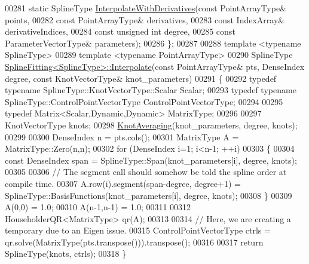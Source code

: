 \begin{DoxyCode}
00281     \textcolor{keyword}{static} SplineType \hyperlink{group___splines___module_a7bd937fdcfa168dbdc27932886a4da9f}{InterpolateWithDerivatives}(\textcolor{keyword}{const} PointArrayType& points,
00282                                                  \textcolor{keyword}{const} PointArrayType& derivatives,
00283                                                  \textcolor{keyword}{const} IndexArray& derivativeIndices,
00284                                                  \textcolor{keyword}{const} \textcolor{keywordtype}{unsigned} \textcolor{keywordtype}{int} degree,
00285                                                  \textcolor{keyword}{const} ParameterVectorType& parameters);
00286   \};
00287 
00288   \textcolor{keyword}{template} <\textcolor{keyword}{typename} SplineType>
00289   \textcolor{keyword}{template} <\textcolor{keyword}{typename} Po\textcolor{keywordtype}{int}ArrayType>
00290   SplineType \hyperlink{group___splines___module_adc80b6f0dd0dbbea28130fb254626874}{SplineFitting<SplineType>::Interpolate}(\textcolor{keyword}{const} 
      PointArrayType& pts, DenseIndex degree, \textcolor{keyword}{const} KnotVectorType& knot\_parameters)
00291   \{
00292     \textcolor{keyword}{typedef} \textcolor{keyword}{typename} SplineType::KnotVectorType::Scalar Scalar;      
00293     \textcolor{keyword}{typedef} \textcolor{keyword}{typename} SplineType::ControlPointVectorType ControlPointVectorType;      
00294 
00295     \textcolor{keyword}{typedef} Matrix<Scalar,Dynamic,Dynamic> MatrixType;
00296 
00297     KnotVectorType knots;
00298     \hyperlink{group___splines___module_ga9474da5ed68bbd9a6788a999330416d6}{KnotAveraging}(knot\_parameters, degree, knots);
00299 
00300     DenseIndex n = pts.cols();
00301     MatrixType A = MatrixType::Zero(n,n);
00302     \textcolor{keywordflow}{for} (DenseIndex i=1; i<n-1; ++i)
00303     \{
00304       \textcolor{keyword}{const} DenseIndex span = SplineType::Span(knot\_parameters[i], degree, knots);
00305 
00306       \textcolor{comment}{// The segment call should somehow be told the spline order at compile time.}
00307       A.row(i).segment(span-degree, degree+1) = SplineType::BasisFunctions(knot\_parameters[i], degree, 
      knots);
00308     \}
00309     A(0,0) = 1.0;
00310     A(n-1,n-1) = 1.0;
00311 
00312     HouseholderQR<MatrixType> qr(A);
00313 
00314     \textcolor{comment}{// Here, we are creating a temporary due to an Eigen issue.}
00315     ControlPointVectorType ctrls = qr.solve(MatrixType(pts.transpose())).transpose();
00316 
00317     \textcolor{keywordflow}{return} SplineType(knots, ctrls);
00318   \}

\end{DoxyCode}
